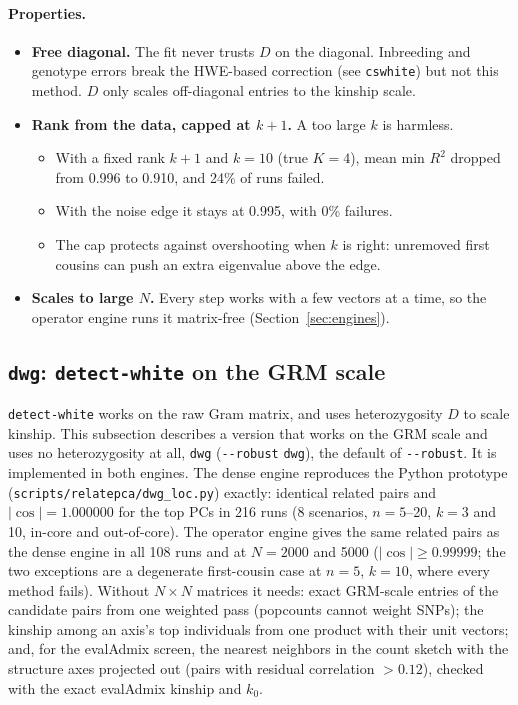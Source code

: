 \documentclass[11pt,a4paper]{article}
\newcommand{\opt}[1]{\texttt{-{}-#1}}
\begin{document}
\paragraph{Properties.}
\begin{itemize}
  \item \textbf{Free diagonal.} The fit never trusts $D$ on the diagonal.
    Inbreeding and genotype errors break the HWE-based correction (see
    \texttt{cswhite}) but not this method. $D$ only scales off-diagonal
    entries to the kinship scale.
  \item \textbf{Rank from the data, capped at $k+1$.} A too large $k$ is
    harmless.
    \begin{itemize}
      \item With a fixed rank $k+1$ and $k=10$ (true $K=4$), mean min $R^2$
        dropped from 0.996 to 0.910, and 24\% of runs failed.
      \item With the noise edge it stays at 0.995, with 0\% failures.
      \item The cap protects against overshooting when $k$ is right: unremoved
        first cousins can push an extra eigenvalue above the edge.
    \end{itemize}
  \item \textbf{Scales to large $N$.} Every step works with a few vectors at a
    time, so the operator engine runs it matrix-free
    (Section~\ref{sec:engines}).
\end{itemize}

\subsection{\texttt{dwg}: \texttt{detect-white} on the GRM scale}
\label{sec:dwg}

\texttt{detect-white} works on the raw Gram matrix, and uses heterozygosity $D$ to
scale kinship. This subsection describes a version that works on the GRM
scale and uses no heterozygosity at all, \texttt{dwg} (\opt{robust}
\texttt{dwg}), the default of \opt{robust}. It is implemented in both
engines. The dense engine reproduces the Python prototype
(\texttt{scripts/relatepca/dwg\_loc.py}) exactly: identical related pairs and
$|\cos|=1.000000$ for the top PCs in 216 runs (8 scenarios, $n=5$--20, $k=3$
and 10, in-core and out-of-core). The operator engine gives the same related
pairs as the dense engine in all 108 runs and at $N=2000$ and 5000
($|\cos|\ge0.99999$; the two exceptions are a degenerate first-cousin case at
$n=5$, $k=10$, where every method fails). Without $N\times N$ matrices it
needs: exact GRM-scale entries of the candidate pairs from one weighted pass
(popcounts cannot weight SNPs); the kinship among an axis's top individuals
from one product with their unit vectors; and, for the evalAdmix screen, the
nearest neighbors in the count sketch with the structure axes projected out
(pairs with residual correlation $>0.12$), checked with the exact evalAdmix
kinship and $k_0$.
\end{document}
